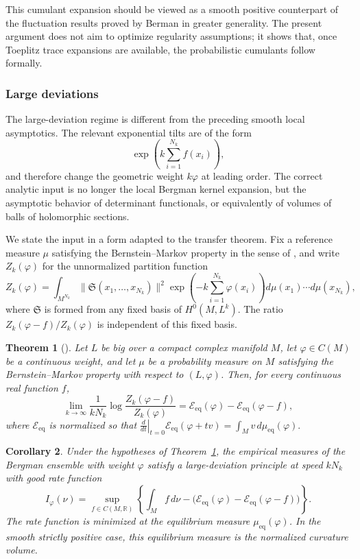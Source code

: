 \documentclass[12pt,a4paper,reqno]{article}
\theoremstyle{thmstyleone}
\newtheorem{theorem}{Theorem}[subsection]
\newtheorem{corollary}[theorem]{Corollary}
\theoremstyle{thmstylethree}
\theoremstyle{thmstyletwo}
\numberwithin{equation}{subsection}
\begin{document}
This cumulant expansion should be viewed as a smooth positive counterpart of the fluctuation results proved by Berman in greater generality. The present argument does not aim to optimize regularity assumptions; it shows that, once Toeplitz trace expansions are available, the probabilistic cumulants follow formally.

\subsubsection{Large deviations}

The large-deviation regime is different from the preceding smooth local asymptotics. The relevant exponential tilts are of the form
\[
    \exp\left(k\sum_{i=1}^{N_k} f(x_i)\right),
\]
and therefore change the geometric weight $k\varphi$ at leading order. The correct analytic input is no longer the local Bergman kernel expansion, but the asymptotic behavior of determinant functionals, or equivalently of volumes of balls of holomorphic sections.

We state the input in a form adapted to the transfer theorem. Fix a reference measure $\mu$ satisfying the Bernstein--Markov property in the sense of \cite{BB}, and write $Z_k(\varphi)$ for the unnormalized partition function
\[
    Z_k(\varphi)
    =
    \int_{M^{N_k}}
    \|\mathfrak S(x_1,\ldots,x_{N_k})\|^2
    \exp\left(-k\sum_{i=1}^{N_k}\varphi(x_i)\right)
    d\mu(x_1)\cdots d\mu(x_{N_k}),
\]
where $\mathfrak S$ is formed from any fixed basis of $H^0(M,L^k)$. The ratio $Z_k(\varphi-f)/Z_k(\varphi)$ is independent of this fixed basis.

\begin{theorem}[{\cite{BB}}]
\label{thm:BB-determinant}
Let $L$ be big over a compact complex manifold $M$, let $\varphi\in C(M)$ be a continuous weight, and let $\mu$ be a probability measure on $M$ satisfying the Bernstein--Markov property with respect to $(L,\varphi)$. Then, for every continuous real function $f$,
\[
\lim_{k\to\infty}\frac{1}{kN_k}\log \frac{Z_k(\varphi-f)}{Z_k(\varphi)}=\mathcal E_{\mathrm{eq}}(\varphi)-\mathcal E_{\mathrm{eq}}(\varphi-f),
\]
where $\mathcal E_{\mathrm{eq}}$ is normalized so that $\left.\frac{d}{dt}\right|_{t=0}\mathcal E_{\mathrm{eq}}(\varphi+tv)=\int_M v\,d\mu_{\mathrm{eq}}(\varphi).$
\end{theorem}

\begin{corollary}\label{cor:Bergman-LDP-transfer}
Under the hypotheses of Theorem~\ref{thm:BB-determinant}, the empirical measures of the Bergman ensemble with weight $\varphi$ satisfy a large-deviation principle at speed $kN_k$ with good rate function
\[
    I_\varphi(\nu)=\sup_{f\in C(M,\mathbb R)}\left\{\int_M f\,d\nu-\bigl(\mathcal E_{\mathrm{eq}}(\varphi)-\mathcal E_{\mathrm{eq}}(\varphi-f)\bigr)\right\}.
\]
The rate function is minimized at the equilibrium measure $\mu_{\mathrm{eq}}(\varphi)$. In the smooth strictly positive case, this equilibrium measure is the normalized curvature volume.
\end{corollary}
\end{document}
